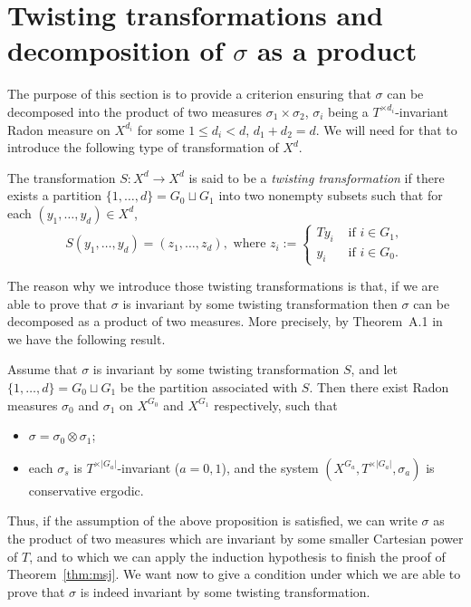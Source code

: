 \documentclass[AHL,Unicode,longabstracts]{cedram}
\newcommand{\egdef}{:=}
\begin{document}
\section{Twisting transformations and decomposition of \texorpdfstring{$\sigma$}{sigma} as a product}
\label{sec:twist}

The purpose of this section is to provide a criterion ensuring that $\sigma$ can be decomposed into the product of two measures $\sigma_1\times\sigma_2$, $\sigma_i$ being a $T^{\times d_i}$-invariant Radon measure on $X^{d_i}$ for some $1\le d_i<d$, $d_1+d_2=d$. We will need for that to introduce the following type of transformation of $X^d$.

\begin{defi}\label{def:twist}
The transformation $S:X^d\to X^d$ is said to be a \emph{twisting transformation} if there exists a partition $\{1,\ldots,d\}=G_0\sqcup G_1$ into two nonempty subsets such that for each $(y_1,\ldots,y_d)\in X^d$,
\[
S(y_1,\ldots, y_d)= (z_1,\ldots,z_d),\text{ where } z_i\egdef
\begin{cases}
T y_i &\text{ if }i\in G_1, \\
y_i &\text{ if }i\in G_0.
\end{cases}
\]
\end{defi}

The reason why we introduce those twisting transformations is that, if we are able to prove that $\sigma$ is invariant by some twisting transformation then $\sigma$ can be decomposed as a product of two measures. More precisely, by Theorem~A.1 in~\cite{ChaconInfinite} we have the following result.

\begin{prop}\label{prop:product}
Assume that $\sigma$ is invariant by some twisting transformation $S$, and let $\{1,\ldots,d\}=G_0\sqcup G_1$ be the partition associated with $S$. Then there exist Radon measures $\sigma_0$ and $\sigma_1$ on $X^{G_0}$ and $X^{G_1}$ respectively, such that
\begin{itemize}
\item $\sigma=\sigma_0\otimes\sigma_1$;
\item each $\sigma_s$ is $T^{\times |G_a|}$-invariant ($a=0,1$), and the system $(X^{G_a},T^{\times |G_a|},\sigma_a)$ is conservative ergodic.
\end{itemize}
\end{prop}

Thus, if the assumption of the above proposition is satisfied, we can write $\sigma$ as the product of two measures which are invariant by some smaller Cartesian power of $T$, and to which we can apply the induction hypothesis to finish the proof of Theorem~\ref{thm:msj}. We want now to give a condition under which we are able to prove that $\sigma$ is indeed invariant by some twisting transformation.
\end{document}
